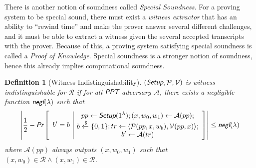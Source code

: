 \documentclass{article}
\theoremstyle{plain}
\newtheorem{definition}{Definition}[section]
\theoremstyle{remark}
\begin{document}
There is another notion of soundness called \textit{Special Soundness}. For a proving system to be special sound, there must exist a \textit{witness extractor} that has an ability to ``rewind time'' and make the prover answer several different challenges, and it must be able to extract a witness given the several accepted transcripts with the prover. Because of this, a proving system satisfying special soundness is called a \textit{Proof of Knowledge}. Special soundness is a stronger notion of soundness, hence this already implies computational soundness.

\begin{definition}[Witness Indistinguishability]
	$(\emph{\textsf{Setup}}, \mathcal{P}, \mathcal{V})$ is witness indistinguishable for $\mathcal{R}$ if for all $\emph{\textsf{PPT}}$ adversary $\mathcal{A}$, there exists a negligible function $\emph{\textsf{negl}}(\lambda)$ such that
	\begin{align*}
		\left| \frac{1}{2} - \emph{\textsf{Pr}}\left[
		\begin{array}{c|c}
			\begin{gathered}
				b' = b
			\end{gathered}
			&
			\begin{gathered}
				pp\leftarrow\emph{\textsf{Setup}}(1^{\lambda}); (x, w_0, w_1)\leftarrow\mathcal{A}(pp); \\
				b\xleftarrow{\$}\{0,1\}; tr\leftarrow\langle\mathcal{P}(pp,x,w_b), \mathcal{V}(pp,x)\rangle; \\
				b'\leftarrow\mathcal{A}(tr)
			\end{gathered}
		\end{array}
		\right]\right|
		\le\emph{\textsf{negl}}(\lambda)
	\end{align*}
	where $\mathcal{A}(pp)$ always outputs $(x,w_0,w_1)$ such that $(x,w_0)\in\mathcal{R}\wedge(x,w_1)\in\mathcal{R}$.
\end{definition}
\end{document}
